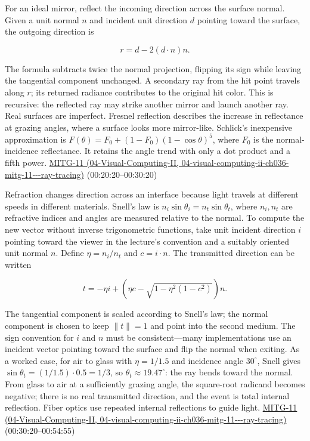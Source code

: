 For an ideal mirror, reflect the incoming direction across the surface normal. Given a unit normal \(n\) and incident unit direction \(d\) pointing toward the surface, the outgoing direction is

\[
r=d-2(d\cdot n)n.
\]

The formula subtracts twice the normal projection, flipping its sign while leaving the tangential component unchanged. A secondary ray from the hit point travels along \(r\); its returned radiance contributes to the original hit color. This is recursive: the reflected ray may strike another mirror and launch another ray. Real surfaces are imperfect. Fresnel reflection describes the increase in reflectance at grazing angles, where a surface looks more mirror-like. Schlick's inexpensive approximation is \(F(\theta)=F_0+(1-F_0)(1-\cos\theta)^5\), where \(F_0\) is the normal-incidence reflectance. It retains the angle trend with only a dot product and a fifth power. \href{../04-Visual-Computing-II/main.pdf\#nameddest=04-visual-computing-ii-ch036-mitg-11---ray-tracing}{MITG-11 (04-Visual-Computing-II, 04-visual-computing-ii-ch036-mitg-11-\/-\/-ray-tracing)} (00:20:20--00:30:20)

Refraction changes direction across an interface because light travels at different speeds in different materials. Snell's law is \(n_i\sin\theta_i=n_t\sin\theta_t\), where \(n_i,n_t\) are refractive indices and angles are measured relative to the normal. To compute the new vector without inverse trigonometric functions, take unit incident direction \(i\) pointing toward the viewer in the lecture's convention and a suitably oriented unit normal \(n\). Define \(\eta=n_i/n_t\) and \(c=i\cdot n\). The transmitted direction can be written

\[
t=-\eta i+\left(\eta c-\sqrt{1-\eta^2(1-c^2)}\right)n.
\]

The tangential component is scaled according to Snell's law; the normal component is chosen to keep \(\|t\|=1\) and point into the second medium. The sign convention for \(i\) and \(n\) must be consistent---many implementations use an incident vector pointing toward the surface and flip the normal when exiting. As a worked case, for air to glass with \(\eta=1/1.5\) and incidence angle \(30^\circ\), Snell gives \(\sin\theta_t=(1/1.5)\cdot0.5=1/3\), so \(\theta_t\approx19.47^\circ\): the ray bends toward the normal. From glass to air at a sufficiently grazing angle, the square-root radicand becomes negative; there is no real transmitted direction, and the event is total internal reflection. Fiber optics use repeated internal reflections to guide light. \href{../04-Visual-Computing-II/main.pdf\#nameddest=04-visual-computing-ii-ch036-mitg-11---ray-tracing}{MITG-11 (04-Visual-Computing-II, 04-visual-computing-ii-ch036-mitg-11-\/-\/-ray-tracing)} (00:30:20--00:54:55)

